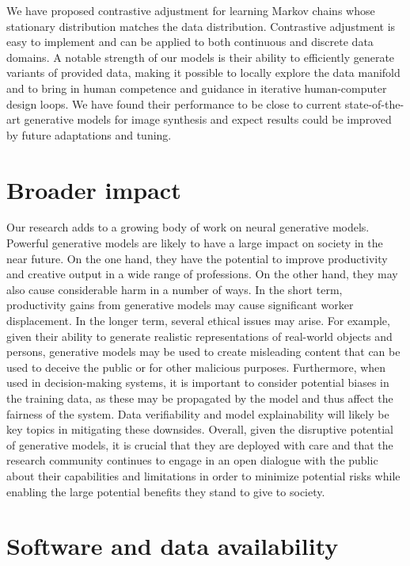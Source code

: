\documentclass[10pt,twocolumn,letterpaper]{article}
\begin{document}
We have proposed contrastive adjustment for learning Markov chains whose stationary distribution matches the data distribution.
Contrastive adjustment is easy to implement and can be applied to both continuous and discrete data domains.
A notable strength of our models is their ability to efficiently generate variants of provided data, making it possible to locally explore the data manifold and to bring in human competence and guidance in iterative human-computer design loops.
We have found their performance to be close to current state-of-the-art generative models for image synthesis and expect results could be improved by future adaptations and tuning.


\section*{Broader impact}

Our research adds to a growing body of work on neural generative models.
Powerful generative models are likely to have a large impact on society in the near future.
On the one hand, they have the potential to improve productivity and creative output in a wide range of professions.
On the other hand, they may also cause considerable harm in a number of ways.
In the short term, productivity gains from generative models may cause significant worker displacement.
In the longer term, several ethical issues may arise.
For example, given their ability to generate realistic representations of real-world objects and persons, generative models may be used to create misleading content that can be used to deceive the public or for other malicious purposes.
Furthermore, when used in decision-making systems, it is important to consider potential biases in the training data, as these may be propagated by the model and thus affect the fairness of the system.
Data verifiability and model explainability will likely be key topics in mitigating these downsides.
Overall, given the disruptive potential of generative models, it is crucial that they are deployed with care and that the research community continues to engage in an open dialogue with the public about their capabilities and limitations in order to minimize potential risks while enabling the large potential benefits they stand to give to society.


\section*{Software and data availability}
\end{document}
